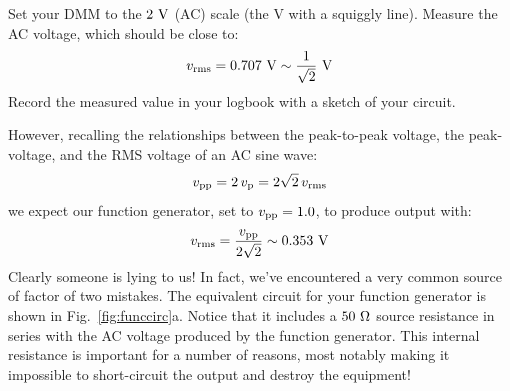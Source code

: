 \begin{measurement} Set your DMM to the $2~\rm V$ (AC) scale (the V with a squiggly line).  Measure the AC voltage, which should be close to: 
\begin{displaymath}
v_{\rm rms} = 0.707~\rm V \sim \frac{1}{\sqrt{2}}~\rm V
\end{displaymath} 
Record the measured value in your logbook with a sketch of
your circuit.
\end{measurement}
However, recalling the relationships between the peak-to-peak voltage,
the peak-voltage, and the RMS voltage of an AC sine wave:
\begin{displaymath}
v_{\rm pp} = 2 \, v_{\rm p} = 2 \sqrt{2} \, v_{\rm rms}
\end{displaymath}
we expect our function generator, set to $v_{\rm pp} = 1.0$, to
produce output with:
\begin{displaymath}
v_{\rm rms} = \frac{v_{\rm pp}}{2\sqrt{2}} \sim 0.353~\rm V
\end{displaymath}
Clearly someone is lying to us!  In fact, we've encountered a very
common source of factor of two mistakes.  The equivalent circuit for
your function generator is shown in Fig.~\ref{fig:funccirc}a.  Notice
that it includes a $50~\rm \Omega$ source resistance in series with
the AC voltage produced by the function generator.  This internal
resistance is important for a number of reasons, most notably making
it impossible to short-circuit the output and destroy the
equipment!


